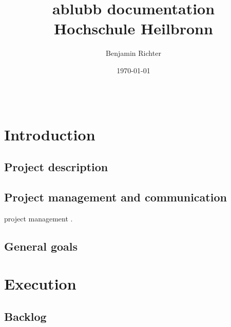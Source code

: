 \documentclass[12pt,a4paper,oneside]{report}
\newcommand{\appname}{ablubb}
\begin{document}
\begin{lstlisting}
\end{lstlisting}
%
\title{
	{\huge \appname{} documentation}
	{\\ \large Hochschule Heilbronn}
}
\author{Benjamin Richter}
\date{\today}
\maketitle
\tableofcontents

\chapter{Introduction}

\section{Project description}

\section{Project management and communication}
project management \citep{mihaela2013measurement}. 


\section{General goals}


\chapter{Execution}

\section{Backlog}
\end{document}
